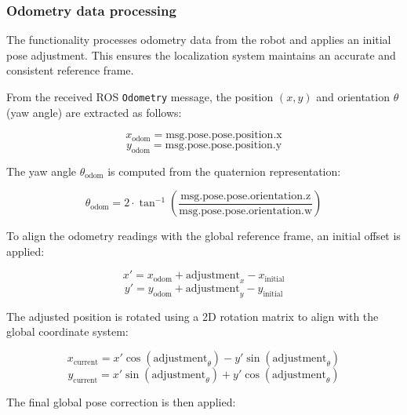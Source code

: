 \documentclass{CSSRforAfrica}
\begin{document}
\subsubsection*{Odometry data processing}

The functionality processes odometry data from the robot and applies an initial pose adjustment. This ensures the localization system maintains an accurate and consistent reference frame.

From the received ROS \texttt{Odometry} message, the position \((x, y)\) and orientation \(\theta\) (yaw angle) are extracted as follows:

\begin{equation}
x_{\text{odom}} = \text{msg.pose.pose.position.x}
\end{equation}
\begin{equation}
y_{\text{odom}} = \text{msg.pose.pose.position.y}
\end{equation}

The yaw angle \(\theta_{\text{odom}}\) is computed from the quaternion representation:

\begin{equation}
\theta_{\text{odom}} = 2 \cdot \tan^{-1} \left( \frac{\text{msg.pose.pose.orientation.z}}{\text{msg.pose.pose.orientation.w}} \right)
\end{equation}

To align the odometry readings with the global reference frame, an initial offset is applied:

\begin{equation}
x' = x_{\text{odom}} + \text{adjustment}_x - x_{\text{initial}}
\end{equation}
\begin{equation}
y' = y_{\text{odom}} + \text{adjustment}_y - y_{\text{initial}}
\end{equation}

The adjusted position is rotated using a 2D rotation matrix to align with the global coordinate system:

\begin{equation}
x_{\text{current}} = x' \cos(\text{adjustment}_\theta) - y' \sin(\text{adjustment}_\theta)
\end{equation}
\begin{equation}
y_{\text{current}} = x' \sin(\text{adjustment}_\theta) + y' \cos(\text{adjustment}_\theta)
\end{equation}

The final global pose correction is then applied:
\end{document}

